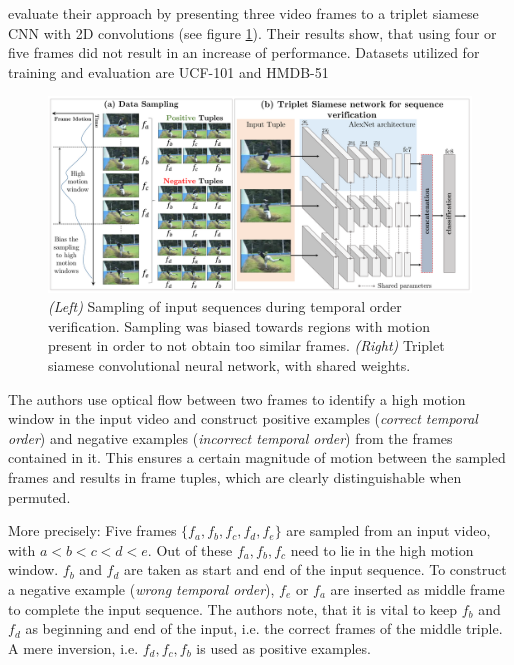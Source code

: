 \textcite{misra_shuffle_2016} evaluate their approach by presenting three video frames to a triplet siamese CNN with 2D convolutions (see figure \ref{fig:shufflelearn_approach}).
Their results show, that using four or five frames did not result in an increase of performance.
Datasets utilized for training and evaluation are UCF-101 \cite{??} and HMDB-51 \cite{??}

\begin{figure}[H]
    \centering
    \includegraphics[width=\textwidth]{img_related/shufflelearn_approach}
    \caption{\textit{(Left)} Sampling of input sequences during temporal order verification. Sampling was biased towards regions with motion present in order to not obtain too similar frames. \textit{(Right)} Triplet siamese convolutional neural network, with shared weights. \cite{misra_shuffle_2016}}
    \label{fig:shufflelearn_approach}
\end{figure}

The authors use optical flow between two frames \cite{farneback_two-frame_2003} to identify a high motion window in the input video and construct positive examples (\textit{correct temporal order}) and negative examples (\textit{incorrect temporal order}) from the frames contained in it.
This ensures a certain magnitude of motion between the sampled frames and results in frame tuples, which are clearly distinguishable when permuted.

More precisely: Five frames $\{f_a, f_b, f_c, f_d, f_e\}$ are sampled from an input video, with $a < b < c < d < e$.
Out of these $f_a, f_b, f_c$ need to lie in the high motion window.
$f_b$ and $f_d$ are taken as start and end of the input sequence.
To construct a negative example (\textit{wrong temporal order}), $f_e$ or $f_a$ are inserted as middle frame to complete the input sequence.
The authors note, that it is vital to keep $f_b$ and $f_d$ as beginning and end of the input, i.e. the correct frames of the middle triple.
A mere inversion, i.e. $f_d, f_c, f_b$ is used as positive examples.

